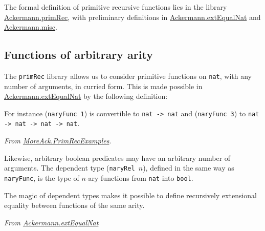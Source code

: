 The formal definition of primitive recursive functions lies in the library
\href{../theories/html/hydras.Ackermann.primRec.html}{Ackermann.primRec},
with preliminary definitions in 
\href{../theories/html/hydras.Ackermann.extEqualNat.html}{Ackermann.extEqualNat}
and
\href{../theories/html/hydras.Ackermann.misc.html}{Ackermann.misc}.

\subsection{Functions of arbitrary arity}

The  \texttt{primRec} library allows us to consider primitive functions on \texttt{nat}, with any number of arguments, in 
curried form. This is made possible in 
\href{../theories/html/hydras.Ackermann.extEqualNat.html}{Ackermann.extEqualNat} by the following definition:



For instance (\texttt{naryFunc 1}) is convertible to \texttt{nat -> nat} and (\texttt{naryFunc 3})
to \texttt{nat -> nat -> nat -> nat}.

\vspace{4pt}
\noindent
\emph{From \href{../theories/html/hydras.MoreAck.PrimRecExamples.html}{MoreAck.PrimRecExamples}}.





Likewise, arbitrary boolean predicates may have an arbitrary number of arguments. The dependent type
(\texttt{naryRel $n$}), defined in the same way as \texttt{naryFunc}, is the type of $n$-ary functions from
\texttt{nat} into \texttt{bool}.



The magic of dependent types makes it possible to define recursively extensional equality between functions of the same arity.

\vspace{4pt}
\noindent
\emph{From \href{../theories/html/hydras.Ackermann.extEqualNat.html}{Ackermann.extEqualNat}}







